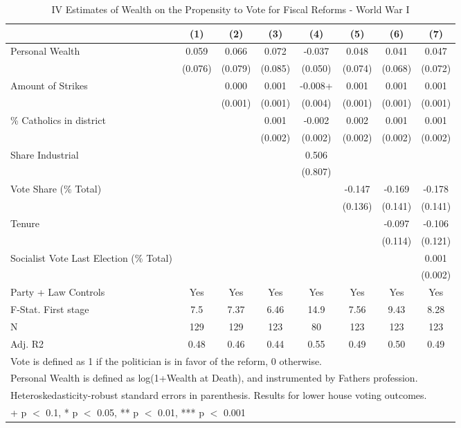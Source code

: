 \begin{table}

\caption{\label{tab:ivresults_robust_ww1}IV Estimates of Wealth on the Propensity to Vote for Fiscal Reforms - World War I}
\centering
\begin{tabular}[t]{lccccccc}
\toprule
  & (1) & (2) & (3) & (4) & (5) & (6) & (7)\\
\midrule
Personal Wealth & 0.059 & 0.066 & 0.072 & -0.037 & 0.048 & 0.041 & 0.047\\
 & (0.076) & (0.079) & (0.085) & (0.050) & (0.074) & (0.068) & (0.072)\\
Amount of Strikes &  & 0.000 & 0.001 & -0.008+ & 0.001 & 0.001 & 0.001\\
 &  & (0.001) & (0.001) & (0.004) & (0.001) & (0.001) & (0.001)\\
\% Catholics in district &  &  & 0.001 & -0.002 & 0.002 & 0.001 & 0.001\\
 &  &  & (0.002) & (0.002) & (0.002) & (0.002) & (0.002)\\
Share Industrial &  &  &  & 0.506 &  &  & \\
 &  &  &  & (0.807) &  &  & \\
Vote Share (\% Total) &  &  &  &  & -0.147 & -0.169 & -0.178\\
 &  &  &  &  & (0.136) & (0.141) & (0.141)\\
Tenure &  &  &  &  &  & -0.097 & -0.106\\
 &  &  &  &  &  & (0.114) & (0.121)\\
Socialist Vote Last Election (\% Total) &  &  &  &  &  &  & 0.001\\
 &  &  &  &  &  &  & (0.002)\\
\midrule
Party + Law Controls & Yes & Yes & Yes & Yes & Yes & Yes & Yes\\
F-Stat. First stage & 7.5 & 7.37 & 6.46 & 14.9 & 7.56 & 9.43 & 8.28\\
N & 129 & 129 & 123 & 80 & 123 & 123 & 123\\
Adj. R2 & 0.48 & 0.46 & 0.44 & 0.55 & 0.49 & 0.50 & 0.49\\
\bottomrule
\multicolumn{8}{l}{\rule{0pt}{1em}Vote is defined as 1 if the politician is in favor of the reform, 0 otherwise.}\\
\multicolumn{8}{l}{\rule{0pt}{1em}Personal Wealth is defined as log(1+Wealth at Death), and instrumented by Fathers profession.}\\
\multicolumn{8}{l}{\rule{0pt}{1em}Heteroskedasticity-robust standard errors in parenthesis. Results for lower house voting outcomes.}\\
\multicolumn{8}{l}{\rule{0pt}{1em}+ p $<$ 0.1, * p $<$ 0.05, ** p $<$ 0.01, *** p $<$ 0.001}\\
\end{tabular}
\end{table}
